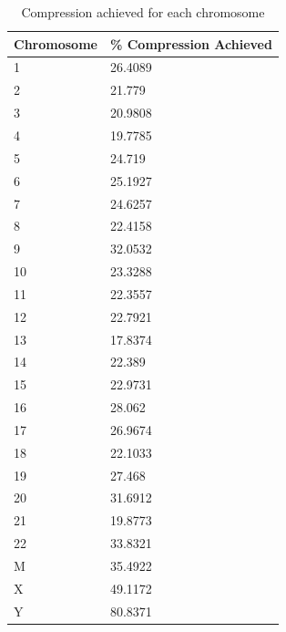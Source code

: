 \documentclass{article}
\begin{document}
\begin{table}
\begin{center}
	\begin{tabular}{|p{1in}|p{1in}|}

	\hline
	Chromosome	&		\% Compression Achieved \\
	\hline
1 & 26.4089\\
	\hline
2 & 21.779\\
	\hline
3 & 20.9808\\
	\hline
4 & 19.7785\\
	\hline
5 & 24.719\\
	\hline
6 & 25.1927\\
	\hline
7 & 24.6257\\
	\hline
8 & 22.4158\\
	\hline
9 & 32.0532\\
	\hline
10 & 23.3288\\
	\hline
11 & 22.3557\\
	\hline
12 & 22.7921\\
	\hline
13 & 17.8374\\
	\hline
14 & 22.389\\
	\hline
15 & 22.9731\\
	\hline
16 & 28.062\\
	\hline
17 & 26.9674\\
	\hline
18 & 22.1033\\
	\hline
19 & 27.468\\
	\hline
20 & 31.6912\\
	\hline
21 & 19.8773\\
	\hline
22 & 33.8321\\
	\hline
M & 35.4922\\
	\hline
X & 49.1172\\
	\hline
Y & 80.8371\\

	\hline
	\end{tabular}
\end{center}
	\caption{Compression achieved for each chromosome}

\end{table}

\clearpage
\end{document}
